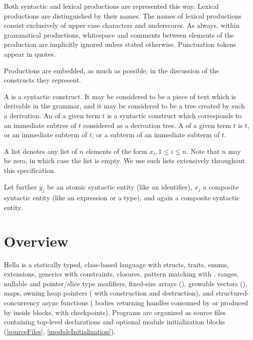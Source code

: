\documentclass[makeidx]{article}
\begin{document}
\LMHash{}%
Both syntactic and lexical productions are represented this way.
Lexical productions are distinguished by their names.
The names of lexical productions consist exclusively of
upper case characters and underscores.
As always, within grammatical productions,
whitespace and comments between elements of the production
are implicitly ignored unless stated otherwise.
Punctuation tokens appear in quotes.

\LMHash{}%
Productions are embedded, as much as possible,
in the discussion of the constructs they represent.

\LMHash{}%
A  is a syntactic construct.
It may be considered to be a piece of text which is derivable in the grammar,
and it may be considered to be a tree created by such a derivation.
An  of a given term $t$ is a syntactic construct
which corresponds to an immediate subtree of $t$
considered as a derivation tree.
A  of a given term $t$ is $t$,
or an immediate subterm of $t$,
or a subterm of an immediate subterm of $t$.

\LMHash{}%
A list  denotes any list of
$n$ elements of the form $x_i, 1 \le i \le n$.
Note that $n$ may be zero, in which case the list is empty.
We use such lists extensively throughout this specification.

%
\LMHash{}%
Let further $y_j$ be an atomic syntactic entity (like an identifier),
$x_j$ a composite syntactic entity (like an expression or a type),
and  again a composite syntactic entity.

\section{Overview}

\LMHash{}%
Hella is a statically typed, class-based language with structs, traits,
enums, extensions, generics with  constraints, closures,
pattern matching with , ranges, nullable and pointer/slice
type modifiers, fixed-size arrays (), growable vectors
(),  maps, owning heap pointers (
with  construction and  destruction), and
structured-concurrency async functions ( bodies returning
 handles consumed by  or produced by
 inside  blocks, with  checkpoints).
Programs are organized as source files containing top-level declarations
and optional module initialization blocks (\ref{sourceFiles},
\ref{moduleInitialization}).
\end{document}
